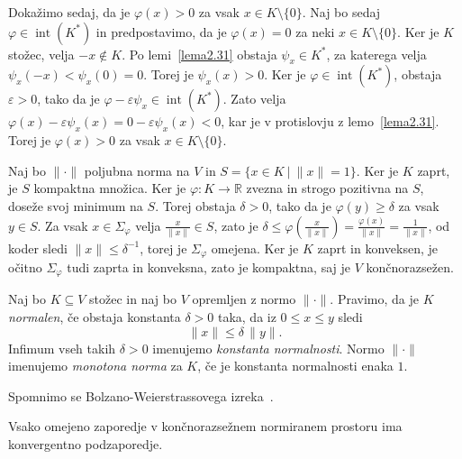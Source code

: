 \documentclass[mat2, tisk]{fmfdelo}
\newcommand{\R}{\mathbb{R}}
\begin{document}
\begin{dokaz}
Dokažimo sedaj, da je $\varphi(x)>0$ za vsak $x\in K\setminus\{0\}$. Naj bo sedaj $\varphi\in\operatorname{int}(K^*)$ in predpostavimo, da
je $\varphi(x)=0$ za neki $x\in K\setminus\{0\}$. Ker je $K$ stožec, velja $-x\notin K$.
Po lemi~\ref{lema2.31} obstaja $\psi_x\in K^*$,
za katerega velja
$\psi_x(-x)<\psi_x(0)=0$.
Torej je $\psi_x(x)>0$. Ker je
$\varphi\in\operatorname{int}(K^*)$, obstaja $\varepsilon>0$, tako da
je $\varphi-\varepsilon\psi_x\in\operatorname{int}(K^*)$. Zato velja
$\varphi(x)-\varepsilon\psi_x(x) = 0 -\varepsilon\psi_x(x) <0$, kar je v protislovju z lemo~\ref{lema2.31}. Torej je
$\varphi(x)>0$ za vsak $x\in K\setminus\{0\}$.

Naj bo $\|\cdot\|$ poljubna norma na $V$ in
$S=\{x\in K ~|~ \|x\|=1\}$. Ker je $K$ zaprt, je $S$ kompaktna množica.
Ker je $\varphi:K\longrightarrow\R$ zvezna in strogo pozitivna na
$S$, doseže svoj minimum na $S$. Torej obstaja $\delta>0$, tako da je
$\varphi(y)\geq\delta$ za vsak $y\in S$. 
Za vsak $x\in\Sigma_\varphi$ velja
$\frac{x}{\|x\|}\in S$, zato je
$\delta\leq\varphi\left(\frac{x}{\|x\|}\right)
=\frac{\varphi(x)}{\|x\|}
=\frac{1}{\|x\|}$, od koder sledi
$\|x\|\leq\delta^{-1}$, torej je
$\Sigma_\varphi$ omejena. Ker je $K$ zaprt in konveksen, je očitno $\Sigma_\varphi$ tudi zaprta in
konveksna, zato je kompaktna, saj je $V$ končnorazsežen.
\end{dokaz}

\begin{definicija}
Naj bo $K \subseteq V$ stožec in naj bo $V$ opremljen z normo $\|\cdot\|$.  
Pravimo, da je $K$ \emph{normalen}, če obstaja konstanta $\delta > 0$ taka, da iz $0 \leq x \leq y$ sledi
\[
\|x\| \leq \delta \, \|y\|.
\]
Infimum vseh takih $\delta > 0$ imenujemo \emph{konstanta normalnosti}.  
Normo $\|\cdot\|$ imenujemo \emph{monotona norma} za $K$, če je konstanta normalnosti enaka $1$.
\end{definicija}

Spomnimo se Bolzano-Weierstrassovega izreka~\cite{Heuser1982}.
\begin{izrek}\label{bolz}
Vsako omejeno zaporedje v končnorazsežnem normiranem prostoru ima konvergentno podzaporedje.
\end{izrek}
\end{document}
